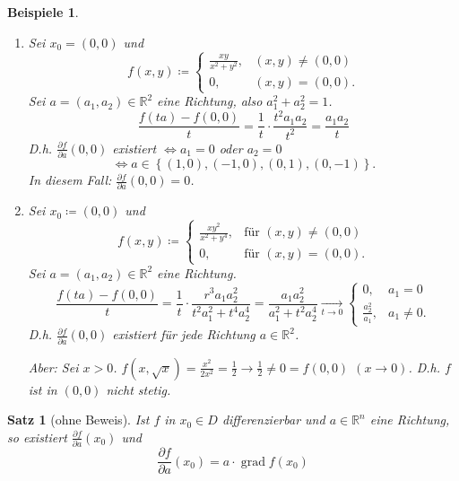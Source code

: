 \documentclass[12pt]{extreport} %
\newcommand{\R}{\mathbb{R}}
\theoremstyle{named}
\theoremstyle{nnamed}
\theoremstyle{itshape}
\newtheorem{satz}[unnamedtheorem]{Satz}
\theoremstyle{normal}
\newtheorem*{beispiele}{Beispiele}
\begin{document}
\begin{beispiele} ~\
	\begin{enumerate}
		\item Sei $x_{0} = (0, 0)$ und 
			$$ f(x, y) \coloneqq \begin{cases} \frac{xy}{x^{2} + y^{2}}, & (x, y) \neq (0, 0) \\ 0, & (x, y) = (0, 0). \end{cases}$$ Sei $a = (a_{1}, a_{2}) \in \R^{2}$ eine Richtung, also $a_{1}^{2} + a_{2}^{2} = 1$.
			$$ \frac{f(ta) - f(0, 0)}{t} = \frac{1}{t} \cdot \frac{t^{2} a_{1} a_{2}}{t^{2}} = \frac{a_{1} a_{2}}{t} $$
			D.h. $\frac{\partial f}{\partial a}(0, 0)$ existiert $\iff a_{1} = 0$ oder $a_{2} = 0$
			$$ \iff a \in \left\{ (1, 0), (-1, 0), (0, 1), (0, -1) \right\}. $$
			In diesem Fall: $\frac{\partial f}{\partial a}(0, 0) = 0$.
		\item Sei $x_{0} \coloneqq (0, 0)$ und
			$$ f(x, y) \coloneqq \begin{cases} \frac{xy^{2}}{x^{2} + y^{4}}, & \text{für } (x, y) \neq (0, 0) \\ 0, & \text{für } (x, y) = (0, 0). \end{cases} $$
			Sei $a = (a_{1}, a_{2}) \in \R^{2}$ eine Richtung.
			$$ \frac{f(ta) - f(0,0)}{t} = \frac{1}{t} \cdot \frac{r^{3} a_{1} a_{2}^{2}}{t^{2} a_{1}^{2} + t^{4} a_{2}^{4}} = \frac{a_{1} a_{2}^{2}}{a_{1}^{2} + t^{2} a_{2}^{4}} \xrightarrow[t \rightarrow 0]{\qquad} \begin{cases} 0, & a_{1} = 0 \\ \frac{a_{2}^{2}}{a_{1}}, & a_{1} \neq 0. \end{cases} $$
			D.h. $\frac{\partial f}{\partial a}(0,0)$ existiert für jede Richtung $a \in \R^{2}$.
			
			\bigskip
			
			Aber: Sei $x > 0$. $f(x, \sqrt{x}) = \frac{x^{2}}{2 x^{2}} = \frac{1}{2} \rightarrow \frac{1}{2} \neq 0 = f(0, 0)$ $(x \rightarrow 0)$. D.h. $f$ ist in $(0, 0)$ nicht stetig.
	\end{enumerate}	
\end{beispiele}


\begin{satz}[ohne Beweis] \label{18.7:satz}
	Ist $f$ in $x_{0} \in D$ differenzierbar und $a \in \R^{n}$ eine Richtung, so existiert $\frac{\partial f}{\partial a}(x_{0})$ und
	$$ \frac{\partial f}{\partial a} (x_{0}) = a \cdot \operatorname{grad} f(x_{0}) $$
\end{satz}
\end{document}
